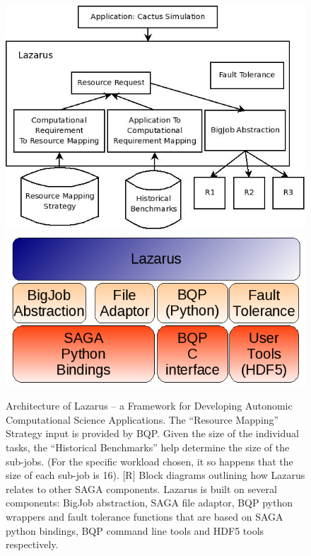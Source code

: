 \documentclass{rspublic}
\newcommand{\up}{\vspace*{-0.3em}}
\begin{document}
\begin{figure}
\includegraphics[scale=0.3]{Lazarus_01.jpeg}
\includegraphics[scale=0.3]{Architecture.png}

\caption{Architecture of Lazarus -- a Framework for Developing
  Autonomic Computational Science Applications. The ``Resource
  Mapping'' Strategy input is provided by BQP. Given the size of the
  individual tasks, the ``Historical Benchmarks'' help determine the
  size of the sub-jobs. (For the specific workload chosen, it so
  happens that the size of each sub-job is 16). [R] Block diagrams
  outlining how Lazarus relates to other SAGA components. Lazarus is
  built on several components: BigJob abstraction, SAGA file adaptor,
  BQP python wrappers and fault tolerance functions that are based on
  SAGA python bindings, BQP command line tools and HDF5 tools
  respectively.}
\label{fig:application_architecture}
\up\up
\end{figure}
\up\up\up
\end{document}
